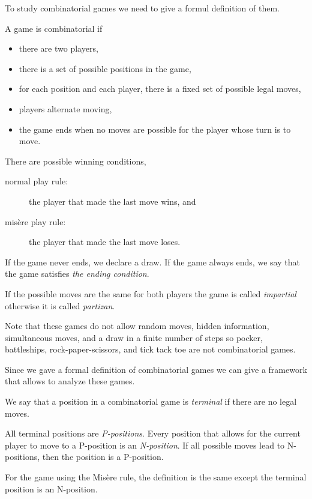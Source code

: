 To study combinatorial games we need to give a formul definition of them.
\begin{definition}
  A game is combinatorial if
  \begin{itemize}
    \item there are two players,
    \item there is a set of possible positions in the game,
    \item for each position and each player, there is a fixed set of possible
      legal moves,
    \item players alternate moving,
    \item the game ends when no moves are possible for the player whose
      turn is to move.
  \end{itemize}
  There are possible winning conditions,
  \begin{description}
    \item [normal play rule:] the player that made the last move wins, and
    \item [mis\`ere play rule:] the player that made the last move loses.
  \end{description}
  If the game never ends, we declare a draw. If the game always ends, we
  say that the game satisfies \emph{the ending condition}.

  If the possible moves are the same for both players the game is
  called \emph{impartial} otherwise it is called \emph{partizan}.
\end{definition}

Note that these games do not allow random moves, hidden information,
simultaneous moves, and a draw in a finite number of steps so
pocker, battleships, rock-paper-scissors, and tick tack toe are not
combinatorial games.

Since we gave a formal definition of combinatorial games we can give a framework
that allows to analyze these games.
\begin{definition}
  We say that a position in a combinatorial game is \emph{terminal} if there
  are no legal moves.

  All terminal positions are \emph{P-positions}. Every position that allows for
  the current player to move to a P-position is an \emph{N-position}. If all
  possible moves lead to N-positions, then the position is a P-position.

  For the game using the Mis\`ere rule, the definition is the same except the
  terminal position is an N-position.
\end{definition}


